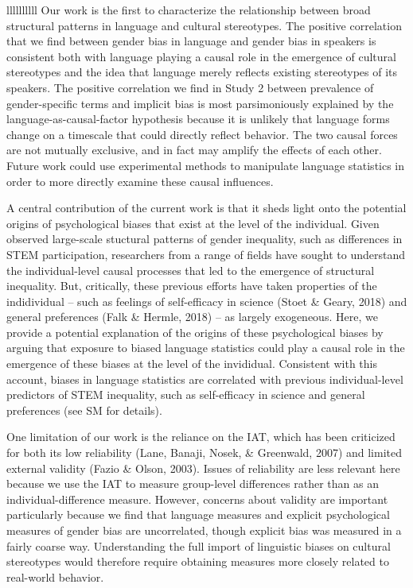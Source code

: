 \documentclass[9pt,twocolumn,twoside,lineno]{pnas-new}
\begin{document}
\begin{table}{llllllllll}
Our work is the first to characterize the relationship between broad
structural patterns in language and cultural stereotypes. The positive
correlation that we find between gender bias in language and gender bias
in speakers is consistent both with language playing a causal role in
the emergence of cultural stereotypes and the idea that language merely
reflects existing stereotypes of its speakers. The positive correlation
we find in Study 2 between prevalence of gender-specific terms and
implicit bias is most parsimoniously explained by the
language-as-causal-factor hypothesis because it is unlikely that
language forms change on a timescale that could directly reflect
behavior. The two causal forces are not mutually exclusive, and in fact
may amplify the effects of each other. Future work could use
experimental methods to manipulate language statistics in order to more
directly examine these causal influences.

A central contribution of the current work is that it sheds light onto
the potential origins of psychological biases that exist at the level of
the individual. Given observed large-scale stuctural patterns of gender
inequality, such as differences in STEM participation, researchers from
a range of fields have sought to understand the individual-level causal
processes that led to the emergence of structural inequality. But,
critically, these previous efforts have taken properties of the
indidividual -- such as feelings of self-efficacy in science (Stoet \&
Geary, 2018) and general preferences (Falk \& Hermle, 2018) -- as
largely exogeneous. Here, we provide a potential explanation of the
origins of these psychological biases by arguing that exposure to biased
language statistics could play a causal role in the emergence of these
biases at the level of the invididual. Consistent with this account,
biases in language statistics are correlated with previous
individual-level predictors of STEM inequality, such as self-efficacy in
science and general preferences (see SM for details).

One limitation of our work is the reliance on the IAT, which has been
criticized for both its low reliability (Lane, Banaji, Nosek, \&
Greenwald, 2007) and limited external validity (Fazio \& Olson, 2003).
Issues of reliability are less relevant here because we use the IAT to
measure group-level differences rather than as an individual-difference
measure. However, concerns about validity are important particularly
because we find that language measures and explicit psychological
measures of gender bias are uncorrelated, though explicit bias was
measured in a fairly coarse way. Understanding the full import of
linguistic biases on cultural stereotypes would therefore require
obtaining measures more closely related to real-world behavior.


\end{table}
\end{document}
